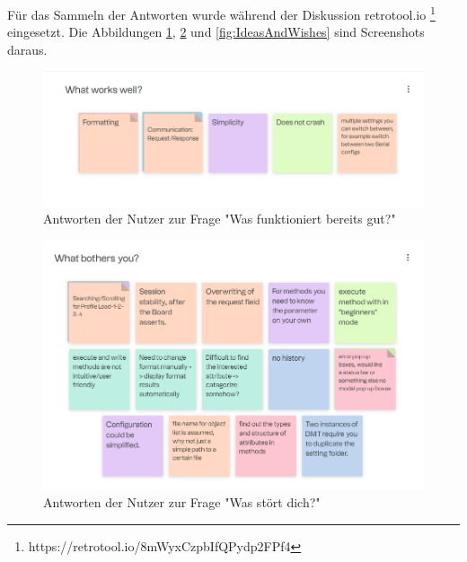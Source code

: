 Für das Sammeln der Antworten wurde während der Diskussion retrotool.io \footnote{https://retrotool.io/8mWyxCzpbIfQPydp2FPf4} eingesetzt.
Die Abbildungen \ref{fig:WhatWorksWell}, \ref{fig:WhatBothersYou} und \ref{fig:IdeasAndWishes} sind Screenshots daraus.


\begin{figure}[H]
   \centering
   \includegraphics[width=1.0\textwidth]{gfx/S1_RetroBoard_WhatWorksWell.png}
   \caption{
       Antworten der Nutzer zur Frage "Was funktioniert bereits gut?"
   }
   \label{fig:WhatWorksWell}
\end{figure}

\begin{figure}[H]
   \centering
   \includegraphics[width=1.0\textwidth]{gfx/S1_RetroBoard_WhatBothersYou.png}
   \caption{
       Antworten der Nutzer zur Frage "Was stört dich?"
   }
   \label{fig:WhatBothersYou}
\end{figure}


